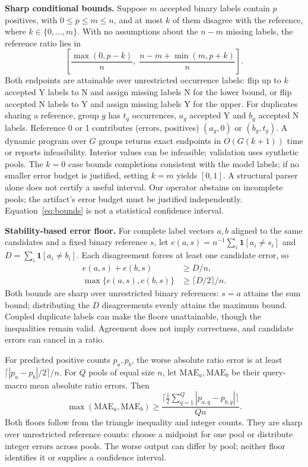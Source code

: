 \documentclass[conference]{IEEEtran}
\newcommand{\indicator}{\mathbf{1}}
\begin{document}
\textbf{Sharp conditional bounds.} Suppose $m$ accepted binary labels contain $p$ positives, with $0\leq p\leq m\leq n$, and at most $k$ of them disagree with the reference, where $k\in\{0,\ldots,m\}$. With no assumptions about the $n-m$ missing labels, the reference ratio lies in
\begin{equation}
\left[\frac{\max(0,p-k)}{n},\;\frac{n-m+\min(m,p+k)}{n}\right].
\label{eq:bounds}
\end{equation}
Both endpoints are attainable over unrestricted occurrence labels: flip up to $k$ accepted Y labels to N and assign missing labels N for the lower bound, or flip accepted N labels to Y and assign missing labels Y for the upper. For duplicates sharing a reference, group $g$ has $t_g$ occurrences, $a_g$ accepted Y and $b_g$ accepted N labels. Reference 0 or 1 contributes (errors, positives) $(a_g,0)$ or $(b_g,t_g)$. A dynamic program over $G$ groups returns exact endpoints in $O(G(k+1))$ time or reports infeasibility. Interior values can be infeasible; validation uses synthetic pools. The $k=0$ case bounds completions consistent with the model labels; if no smaller error budget is justified, setting $k=m$ yields $[0,1]$. A structural parser alone does not certify a useful interval. Our operator abstains on incomplete pools; the artifact's error budget must be justified independently. Equation~\eqref{eq:bounds} is not a statistical confidence interval.

\textbf{Stability-based error floor.} For complete label vectors $a,b$ aligned to the same candidates and a fixed binary reference $s$, let $e(a,s)=n^{-1}\sum_i\indicator[a_i\ne s_i]$ and $D=\sum_i\indicator[a_i\ne b_i]$. Each disagreement forces at least one candidate error, so
\begin{equation}
\begin{aligned}
e(a,s)+e(b,s)&\ge D/n,\\
\max\{e(a,s),e(b,s)\}&\ge \lceil D/2\rceil/n.
\end{aligned}
\label{eq:stability}
\end{equation}
Both bounds are sharp over unrestricted binary references: $s=a$ attains the sum bound; distributing the $D$ disagreements evenly attains the maximum bound. Coupled duplicate labels can make the floors unattainable, though the inequalities remain valid. Agreement does not imply correctness, and candidate errors can cancel in a ratio.

For predicted positive counts $p_a,p_b$, the worse absolute ratio error is at least $\lceil|p_a-p_b|/2\rceil/n$. For $Q$ pools of equal size $n$, let $\mathrm{MAE}_a,\mathrm{MAE}_b$ be their query-macro mean absolute ratio errors. Then
\begin{equation}
\max(\mathrm{MAE}_a,\mathrm{MAE}_b)\geq
\frac{\lceil\frac{1}{2}\sum_{q=1}^{Q}|p_{a,q}-p_{b,q}|\rceil}{Qn}.
\label{eq:ratio-floor}
\end{equation}
Both floors follow from the triangle inequality and integer counts. They are sharp over unrestricted reference counts: choose a midpoint for one pool or distribute integer errors across pools. The worse output can differ by pool; neither floor identifies it or supplies a confidence interval.
\end{document}
